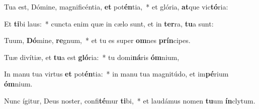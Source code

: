 \item Tua est, Dómine, magnificéntia, \textbf{et} pot\textbf{én}tia,~* et glória, \textbf{at}que vic\textbf{tó}ria:
\item Et \textbf{ti}bi laus:~* cuncta enim quæ in cælo sunt, et in \textbf{ter}ra, \textbf{tu}a sunt:
\item Tuum, \textbf{Dó}mine, \textbf{re}gnum,~* et tu es super \textbf{om}nes \textbf{prín}cipes.
\item Tuæ divítiæ, et \textbf{tu}a est \textbf{gló}ria:~* tu domi\textbf{ná}ris \textbf{óm}nium,
\item In manu tua virtus \textbf{et} pot\textbf{én}tia:~* in manu tua magnitúdo, et im\textbf{pé}rium \textbf{óm}nium.
\item Nunc ígitur, Deus noster, confi\textbf{té}mur \textbf{ti}bi,~* et laudámus nomen \textbf{tu}um \textbf{ín}clytum.
